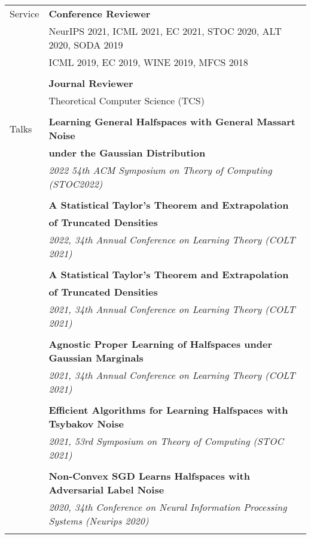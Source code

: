 \documentclass[letterpaper,11pt,oneside]{article}
\begin{document}
\begin{longtable}{@{} l l}
  \Large{Service} &\textbf{Conference Reviewer}\\

    & NeurIPS 2021, ICML 2021, EC 2021, STOC 2020, ALT 2020, SODA 2019 \\ 
    & ICML 2019, EC 2019, WINE 2019, MFCS 2018 \\
    &\\

    &\textbf{Journal Reviewer}\\
    & Theoretical Computer Science (TCS)\\
    & \\

 \Large{Talks}

 &\textbf{Learning General Halfspaces with General Massart Noise}\\
 & \textbf{under the Gaussian Distribution}\\
 & \emph{2022 54th ACM Symposium on Theory of Computing (STOC2022)}\\
 & \\

 &\textbf{A Statistical Taylor's Theorem and Extrapolation}\\
 & \textbf{of Truncated Densities}\\
 & \emph{2022, 34th Annual Conference on Learning Theory (COLT 2021)} \\
 & \\

 &\textbf{A Statistical Taylor's Theorem and Extrapolation}\\
 & \textbf{of Truncated Densities}\\
 & \emph{2021, 34th Annual Conference on Learning Theory (COLT 2021)} \\
 & \\

 &\textbf{Agnostic Proper Learning of Halfspaces under Gaussian Marginals}\\
 & \emph{2021, 34th Annual Conference on Learning Theory (COLT 2021)} \\
 & \\

 &\textbf{Efficient Algorithms for Learning Halfspaces with Tsybakov Noise} \\
 & \emph{2021, 53rd Symposium on Theory of Computing (STOC 2021)} \\
 & \\

     &\textbf{Non-Convex SGD Learns Halfspaces with Adversarial Label Noise} \\
     & \emph{2020, 34th Conference on Neural Information Processing Systems (Neurips 2020)} \\
     & \\


\end{longtable}
\end{document}
